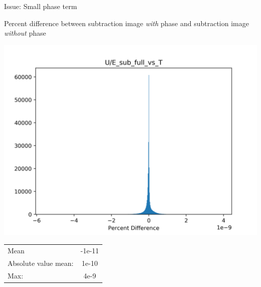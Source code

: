 \documentclass[presentation]{beamer}
\begin{document}
  \begin{frame}{Issue: Small phase term}

    \footnotesize{Percent difference between subtraction image \textit{with} phase and subtraction image \textit{without} phase}
    
    \centering
    \includegraphics[width=0.8\linewidth]{figs/esub}

    \begin{tabular}{l | c }
    Mean & -1e-11\\
    Absolute value mean: & 1e-10\\
    Max: & 4e-9\\
  \end{tabular}  

    
  \end{frame}
\end{document}
